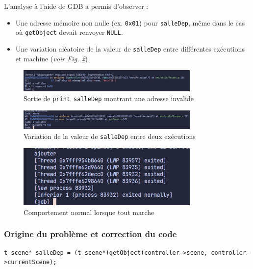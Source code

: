 \documentclass[a4paper,11pt]{article}
\begin{document}
\newpage
L'analyse à l'aide de GDB a permis d'observer : 
\begin{itemize} 
    \item Une adresse mémoire non nulle (ex. \texttt{0x01}) pour \texttt{salleDep}, même dans le cas où \texttt{getObject} devait renvoyer \texttt{NULL}. 
    \item Une variation aléatoire de la valeur de \texttt{salleDep} entre différentes exécutions et machine (\textit{voir Fig. \ref{fig:gdb0x1}})
\end{itemize}

\begin{figure}[h]
\centering
\includegraphics[width=0.8\textwidth]{./img/gdb0xf0.png}
\caption{Sortie de \texttt{print salleDep} montrant une adresse invalide}
\label{fig:gdb0xf0}
\end{figure}

\begin{figure}[h]
\centering
\includegraphics[width=0.8\textwidth]{./img/gdb0x1.png}
\caption{Variation de la valeur de \texttt{salleDep} entre deux exécutions}
\label{fig:gdb0x1}
\end{figure}

\begin{figure}[h]
\centering
\includegraphics[width=0.8\textwidth]{./img/gdbNoError.png}
\caption{Comportement normal lorsque tout marche}
\label{fig:gdbNoError}
\end{figure}

\subsubsection{Origine du problème et correction du code}

\begin{lstlisting}[caption={Ligne fautive}, label=code:fautive]
t_scene* salleDep = (t_scene*)getObject(controller->scene, controller->currentScene);
\end{lstlisting}
\end{document}
